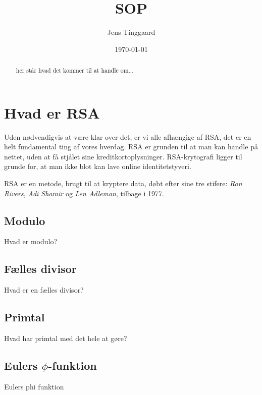 \documentclass[a4paper, 12pt]{article}
\date{\today}
\title{SOP}
\author{Jens Tinggaard}
\begin{document}
\clearpage\maketitle
\thispagestyle{empty}
\maketitle

\begin{abstract}
her står hvad det kommer til at handle om...
\end{abstract}



\newpage
\tableofcontents


\newpage
\section{Hvad er RSA}
Uden nødvendigvis at være klar over det, er vi alle afhængige af RSA, det er en helt fundamental ting af vores hverdag.
RSA er grunden til at man kan handle på nettet, uden at få stjålet sine kreditkortoplysninger.
RSA-krytografi ligger til grunde for, at man ikke blot kan lave online identitetstyveri.
\autocite{vestergaard}
\par
RSA er en metode, brugt til at kryptere data, døbt efter sine tre stifere:
\textit{Ron Rivers}, \textit{Adi Shamir} og \textit{Len Adleman}, tilbage i 1977.

    \subsection{Modulo}
    Hvad er modulo?

    \subsection{Fælles divisor}
    Hvad er en fælles divisor?

    \subsection{Primtal}
    Hvad har primtal med det hele at gøre?

    \subsection{Eulers \texorpdfstring{$\phi$}{Lg}-funktion}
    Eulers phi funktion
\end{document}

